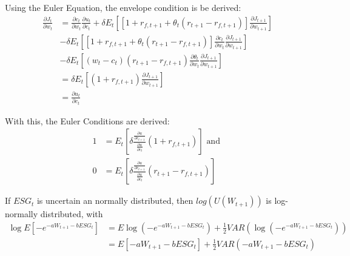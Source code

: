 \documentclass[]{article}
\begin{document}
Using the Euler Equation, the envelope condition is be derived:
\begin{align*}
	\frac{\partial J_t}{\partial w_t} &= \frac{\partial c_t}{\partial w_t} \frac{\partial u_t}{\partial c_t} + \delta E_t \left[\left[1 + r_{f,t+1} + \theta_t(r_{t+1}-r_{f, t+1}) \right]\frac{\partial J_{t+1}}{\partial w_{t+1}}\right]\\
	&- \delta E_t \left[\left[1 + r_{f,t+1} + \theta_t(r_{t+1}-r_{f, t+1}) \right]\frac{\partial c_t}{\partial w_t}\frac{\partial J_{t+1}}{\partial w_{t+1}}\right]\\
	&- \delta E_t\left[(w_t - c_t)(r_{t+1}-r_{f, t+1})\frac{\partial \theta_t}{\partial w_t}\frac{\partial J_{t+1}}{\partial w_{t+1}}\right]\\
	&= \delta E_t \left[(1 + r_{f,t+1})\frac{\partial J_{t+1}}{\partial w_{t+1}} \right]\\
	&= \frac{\partial u_t}{\partial c_t}
\end{align*}

With this, the Euler Conditions are derived:
\begin{align*}
	1 &= E_t \left[\delta \frac{\frac{\partial u}{\partial c_{t+1}}}{\frac{\partial u}{\partial c_t}}(1+r_{f, t+1})\right] \text{ and } \\
	0 &= E_t \left[\delta \frac{\frac{\partial u}{\partial c_{t+1}}}{\frac{\partial u}{\partial c_t}}(r_{t+1} - r_{f, t+1})\right]
\end{align*}

If $ESG_t$ is uncertain an normally distributed, then $log(U(W_{t+1}))$ is log-normally distributed, with
\begin{align*}
	\log E \left[-e^{-aW_{t+1} - bESG_t}\right] &= E \log(-e^{-aW_{t+1} - bESG_t}) + \frac{1}{2}VAR(\log(-e^{-aW_{t+1} - bESG_t}))\\
	&= E \left[-aW_{t+1} - bESG_t\right] + \frac{1}{2}VAR(-aW_{t+1} - bESG_t)
\end{align*}
\end{document}
